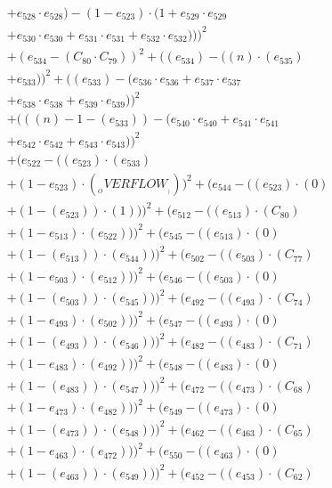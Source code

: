 \documentclass[10pt, a4paper]{article}
\begin{document}
\begin{align*}
& + e_{528} \cdot e_{528}) - (1 - e_{523}) \cdot (1 + e_{529} \cdot e_{529} \\
& + e_{530} \cdot e_{530} + e_{531} \cdot e_{531} + e_{532} \cdot e_{532})))^{2} \\
& + (e_{534} - (C_{80}  \cdot  C_{79}))^{2} + ((e_{534}) - ((n)  \cdot  (e_{535}) \\
& + e_{533}))^{2} + ((e_{533}) - (e_{536} \cdot e_{536} + e_{537} \cdot e_{537} \\
& + e_{538} \cdot e_{538} + e_{539} \cdot e_{539}))^{2} \\
& + (((n) - 1 - (e_{533})) - (e_{540} \cdot e_{540} + e_{541} \cdot e_{541} \\
& + e_{542} \cdot e_{542} + e_{543} \cdot e_{543}))^{2} \\
& + (e_{522} - ((e_{523})  \cdot  (e_{533}) \\
& + (1 - e_{523})  \cdot  (__OVERFLOW__)))^{2} + (e_{544} - ((e_{523}) \cdot (0) \\
& + (1 - (e_{523})) \cdot (1)))^{2} + (e_{512} - ((e_{513})  \cdot  (C_{80}) \\
& + (1 - e_{513})  \cdot  (e_{522})))^{2} + (e_{545} - ((e_{513}) \cdot (0) \\
& + (1 - (e_{513})) \cdot (e_{544})))^{2} + (e_{502} - ((e_{503})  \cdot  (C_{77}) \\
& + (1 - e_{503})  \cdot  (e_{512})))^{2} + (e_{546} - ((e_{503}) \cdot (0) \\
& + (1 - (e_{503})) \cdot (e_{545})))^{2} + (e_{492} - ((e_{493})  \cdot  (C_{74}) \\
& + (1 - e_{493})  \cdot  (e_{502})))^{2} + (e_{547} - ((e_{493}) \cdot (0) \\
& + (1 - (e_{493})) \cdot (e_{546})))^{2} + (e_{482} - ((e_{483})  \cdot  (C_{71}) \\
& + (1 - e_{483})  \cdot  (e_{492})))^{2} + (e_{548} - ((e_{483}) \cdot (0) \\
& + (1 - (e_{483})) \cdot (e_{547})))^{2} + (e_{472} - ((e_{473})  \cdot  (C_{68}) \\
& + (1 - e_{473})  \cdot  (e_{482})))^{2} + (e_{549} - ((e_{473}) \cdot (0) \\
& + (1 - (e_{473})) \cdot (e_{548})))^{2} + (e_{462} - ((e_{463})  \cdot  (C_{65}) \\
& + (1 - e_{463})  \cdot  (e_{472})))^{2} + (e_{550} - ((e_{463}) \cdot (0) \\
& + (1 - (e_{463})) \cdot (e_{549})))^{2} + (e_{452} - ((e_{453})  \cdot  (C_{62}) \\

\end{align*}
\end{document}
